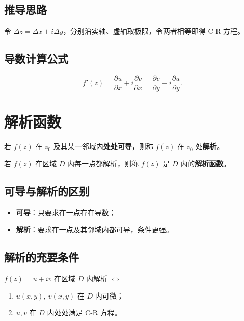	\subsection{推导思路}
	令 \(\Delta z=\Delta x+i\Delta y\)，分别沿实轴、虚轴取极限，令两者相等即得 C-R 方程。
	
	\subsection{导数计算公式}
	\[
	f'(z)=\frac{\partial u}{\partial x}+i\frac{\partial v}{\partial x}
	=\frac{\partial v}{\partial y}-i\frac{\partial u}{\partial y}.
	\]
	
	\section{解析函数}
	\begin{tcolorbox}[title=定义：解析函数, colframe=blue!50!black, colback=blue!5!white, sharp corners]
		若 \(f(z)\) 在 \(z_0\) 及其某一邻域内\textbf{处处可导}，则称 \(f(z)\) 在 \(z_0\) 处\textbf{解析}。
		
		若 \(f(z)\) 在区域 \(D\) 内每一点都解析，则称 \(f(z)\) 是 \(D\) 内的\textbf{解析函数}。
	\end{tcolorbox}
	
	\subsection{可导与解析的区别}
	\begin{tcolorbox}[colframe=orange!75!black, colback=orange!5!white, leftrule=4pt, rightrule=0pt, toprule=0pt, bottomrule=0pt, sharp corners]
		\begin{itemize}
			\item \textbf{可导}：只要求在一点存在导数；
			\item \textbf{解析}：要求在一点及其邻域内都可导，条件更强。
		\end{itemize}
	\end{tcolorbox}
	
	\subsection{解析的充要条件}
	\(f(z)=u+iv\) 在区域 \(D\) 内解析 \(\iff\)
	\begin{enumerate}
		\item \(u(x,y),\ v(x,y)\) 在 \(D\) 内可微；
		\item \(u,v\) 在 \(D\) 内处处满足 C-R 方程。
	\end{enumerate}
	
